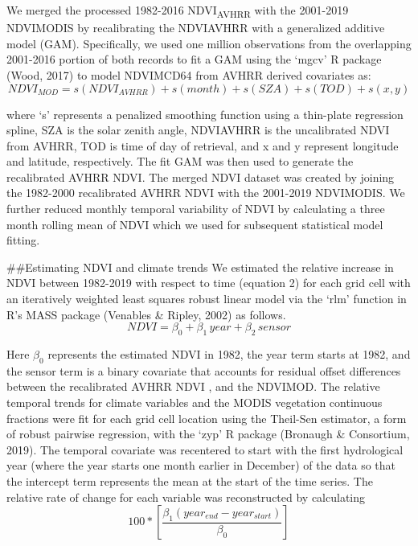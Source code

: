 \documentclass[gc, manuscript]{copernicus}
\begin{document}
We merged the processed 1982-2016 NDVI\textsubscript{AVHRR} with the
2001-2019 NDVIMODIS by recalibrating the NDVIAVHRR with a generalized
additive model (GAM). Specifically, we used one million observations
from the overlapping 2001-2016 portion of both records to fit a GAM
using the `mgcv' R package (Wood, 2017) to model NDVIMCD64 from AVHRR
derived covariates as: \begin{equation}
NDVI_{MOD} = s(NDVI_{AVHRR})+s(month) + s(SZA) + s(TOD) + s(x,y)
\end{equation}

where `s' represents a penalized smoothing function using a thin-plate
regression spline, SZA is the solar zenith angle, NDVIAVHRR is the
uncalibrated NDVI from AVHRR, TOD is time of day of retrieval, and x and
y represent longitude and latitude, respectively. The fit GAM was then
used to generate the recalibrated AVHRR NDVI. The merged NDVI dataset
was created by joining the 1982-2000 recalibrated AVHRR NDVI with the
2001-2019 NDVIMODIS. We further reduced monthly temporal variability of
NDVI by calculating a three month rolling mean of NDVI which we used for
subsequent statistical model fitting.

\#\#Estimating NDVI and climate trends We estimated the relative
increase in NDVI between 1982-2019 with respect to time (equation 2) for
each grid cell with an iteratively weighted least squares robust linear
model via the `rlm' function in R's MASS package (Venables \& Ripley,
2002) as follows. \begin{equation}
NDVI=\beta_0+ \beta_1\,year+\beta_2\,sensor
\end{equation}

Here \(\beta_0\) represents the estimated NDVI in 1982, the year term
starts at 1982, and the sensor term is a binary covariate that accounts
for residual offset differences between the recalibrated AVHRR NDVI ,
and the NDVIMOD. The relative temporal trends for climate variables and
the MODIS vegetation continuous fractions were fit for each grid cell
location using the Theil-Sen estimator, a form of robust pairwise
regression, with the `zyp' R package (Bronaugh \& Consortium, 2019). The
temporal covariate was recentered to start with the first hydrological
year (where the year starts one month earlier in December) of the data
so that the intercept term represents the mean at the start of the time
series. The relative rate of change for each variable was reconstructed
by calculating \begin{equation}
100*[\frac{\beta_1(year_{end}-year_{start})}{\beta_0}]
\end{equation}
\end{document}
